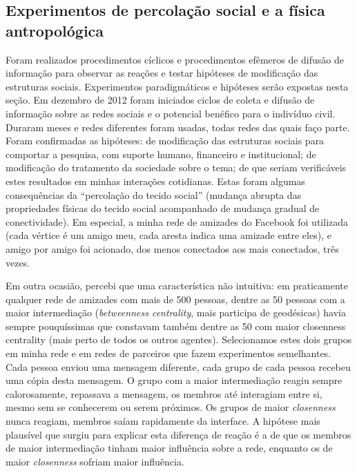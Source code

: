 \documentclass[a4paper,openright,12pt]{report} %
\begin{document}
\subsection{Experimentos de percolação social e a física antropológica}\label{sec:exp}
Foram realizados procedimentos cíclicos e procedimentos efêmeros
de difusão de informação para observar as reações
e testar hipóteses de modificação das estruturas sociais.
Experimentos paradigmáticos e hipóteses serão expostas nesta seção.
    Em dezembro de 2012 foram iniciados ciclos de
        coleta e difusão de informação sobre
        as redes sociais e o potencial benéfico para
        o indivíduo civil. Duraram meses e redes diferentes
        foram usadas, todas redes das quais faço parte. 
	Foram confirmadas 
        as hipóteses: 
	de modificação das
        estruturas sociais para comportar a pesquisa,
        com suporte humano, financeiro e institucional;
	de modificação
        do tratamento da sociedade sobre o tema;
        de que seriam
        verificáveis estes resultados em minhas
        interações cotidianas.
        Estas foram algumas consequências da ``percolação
        do tecido social'' (mudança abrupta das propriedades físicas do tecido social
        acompanhado de mudança gradual de conectividade).
        Em especial, a minha rede de amizades do Facebook
        foi utilizada (cada vértice é um amigo meu,
        cada aresta indica uma amizade entre eles), e
        amigo por amigo foi acionado,
	dos menos conectados aos mais conectados, três vezes.~\cite{mit}

    Em outra ocasião, percebi que
        uma característica não intuitiva:
        em praticamente qualquer rede de amizades com mais de 500 pessoas, dentre as 50 pessoas com a
        maior intermediação (\emph{betweenness centrality}, mais participa de geodésicas)
        havia sempre pouquíssimas que constavam também dentre as 50
        com maior closenness centrality (mais perto de todos os outros agentes). 
        Selecionamos estes dois grupos em minha
        rede e em redes de parceiros que fazem experimentos semelhantes.
        Cada pessoa enviou uma mensagem diferente, cada grupo de cada pessoa
        recebeu uma cópia desta mensagem. O grupo com a maior intermediação
        reagiu sempre calorosamente, repassava a mensagem, os membros até interagiam entre si,
        mesmo sem se conhecerem ou serem próximos.
        Os grupos de maior \emph{closenness} nunca reagiam, membros saíam rapidamente 
        da interface. A hipótese mais plausível que surgiu
        para explicar esta diferença de reação é a de que os membros de maior intermediação
        tinham maior influência sobre
        a rede, enquanto os de maior \emph{closenness} sofriam maior influência.
\end{document}
